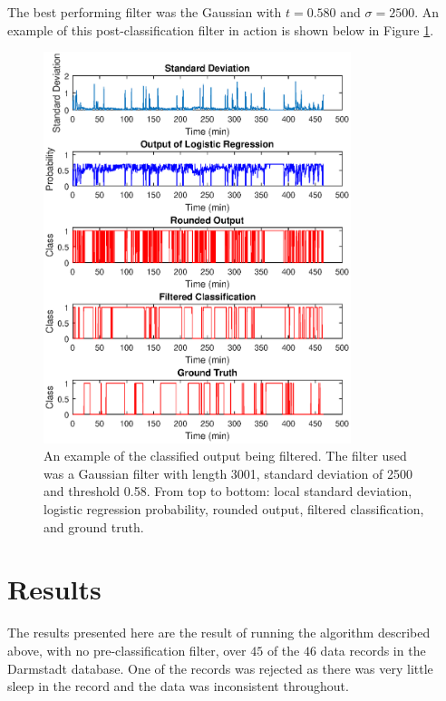             The best performing filter was the Gaussian with $t=0.580$ and $\sigma=2500$. An example of this post-classification filter in action is shown below in Figure \ref{img_post_filter_ex}.

            \begin{figure}[h]
                \includegraphics[width=0.8\textwidth]{Images/post_prediction_filters_ex.eps}
                \centering
                \caption{An example of the classified output being filtered. The filter used was a Gaussian filter with length 3001, standard deviation of 2500 and threshold 0.58. From top to bottom: local standard deviation, logistic regression probability, rounded output, filtered classification, and ground truth.}
                \label{img_post_filter_ex}
            \end{figure}


    \chapter{Results}

        The results presented here are the result of running the algorithm described above, with no pre-classification filter, over $45$ of the $46$ data records in the Darmstadt database. One of the records was rejected as there was very little sleep in the record and the data was inconsistent throughout.

